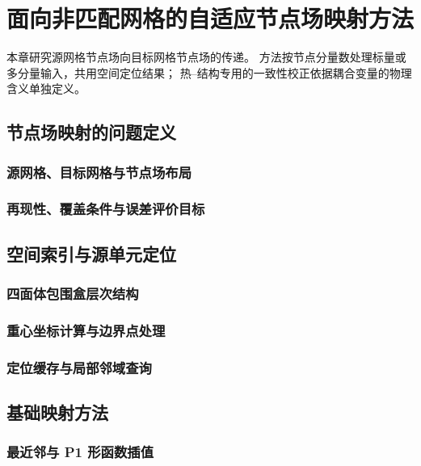 \chapter{面向非匹配网格的自适应节点场映射方法}
\label{chap:mapping}

本章研究源网格节点场向目标网格节点场的传递。
方法按节点分量数处理标量或多分量输入，共用空间定位结果；
热--结构专用的一致性校正依据耦合变量的物理含义单独定义。

\section{节点场映射的问题定义}
\subsection{源网格、目标网格与节点场布局}
\thesisdraftnote

\subsection{再现性、覆盖条件与误差评价目标}
\thesisdraftnote

\section{空间索引与源单元定位}
\subsection{四面体包围盒层次结构}
\thesisdraftnote

\subsection{重心坐标计算与边界点处理}
\thesisdraftnote

\subsection{定位缓存与局部邻域查询}
\thesisdraftnote

\section{基础映射方法}
\subsection{最近邻与 P1 形函数插值}
\thesisdraftnote


